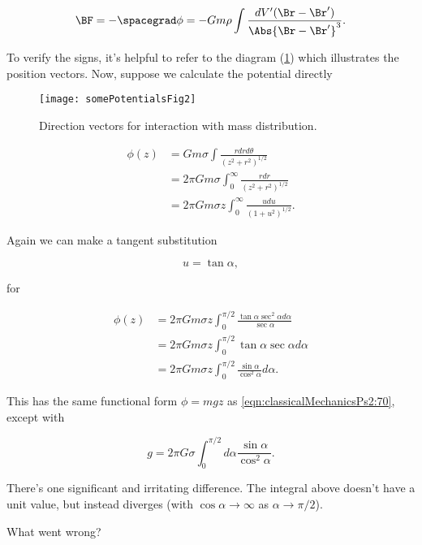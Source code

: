 \begin{equation}\label{eqn:classicalMechanicsPs2:130}
\BF = - \spacegrad \phi = - G m \rho \int \frac{dV' (\Br - \Br')}{\Abs{\Br - \Br'}^3}.
\end{equation}

To verify the signs, it's helpful to refer to the diagram (\ref{fig:classicalMechanicsPs2:somePotentialsFig2}) which illustrates the position vectors.  Now, suppose we calculate the potential directly
\begin{figure}[htp]
   \centering
   \texttt{[image: somePotentialsFig2]}
   \caption{Direction vectors for interaction with mass distribution.}\label{fig:classicalMechanicsPs2:somePotentialsFig2}
\end{figure}

\begin{align*}
\phi(z)
&= G m \sigma \int \frac{r dr d\theta}{(z^2 + r^2)^{1/2}} \\
&= 2 \pi G m \sigma \int_0^\infty \frac{r dr }{(z^2 + r^2)^{1/2}} \\
&= 2 \pi G m \sigma z \int_0^\infty \frac{u du }{(1 + u^2)^{1/2}}.
\end{align*}

Again we can make a tangent substitution

\begin{equation}\label{eqn:classicalMechanicsPs2:150}
u = \tan\alpha,
\end{equation}

for

\begin{align*}
\phi(z)
&= 2 \pi G m \sigma z \int_0^{\pi/2} \frac{\tan \alpha \sec^2 \alpha d \alpha }{\sec\alpha} \\
&= 2 \pi G m \sigma z \int_0^{\pi/2} \tan \alpha \sec \alpha d \alpha \\
&= 2 \pi G m \sigma z \int_0^{\pi/2} \frac{\sin \alpha}{\cos^2 \alpha} d \alpha.
\end{align*}

This has the same functional form $\phi = m g z$ as \ref{eqn:classicalMechanicsPs2:70}, except with

\begin{equation}\label{eqn:classicalMechanicsPs2:n}
g = 2 \pi G \sigma \int_0^{\pi/2} d\alpha \frac{\sin \alpha}{\cos^2 \alpha}.
\end{equation}

There's one significant and irritating difference.  The integral above doesn't have a unit value, but instead diverges (with $\cos\alpha \rightarrow \infty$ as $\alpha \rightarrow \pi/2$).

What went wrong?

\EndNoBibArticle
